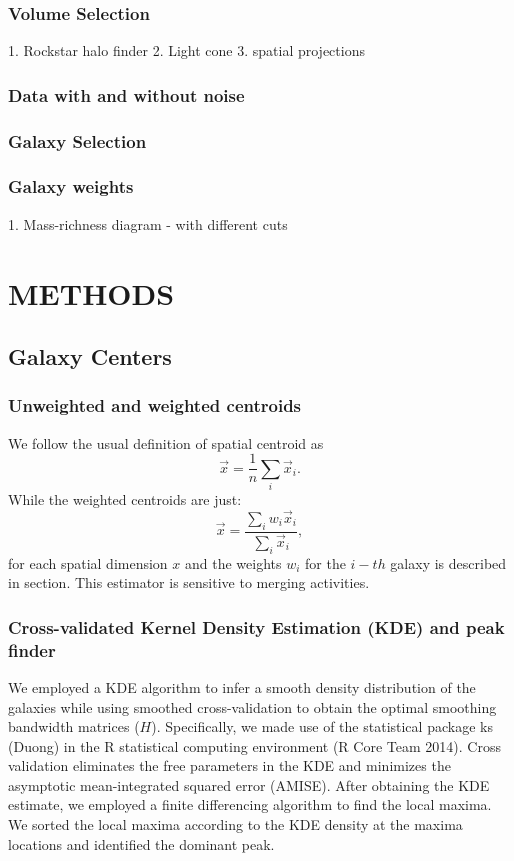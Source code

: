 \documentclass[letterpaper,useAMS,usenatbib]{mn2e}
\begin{document}
\subsubsection{Volume Selection}
1. Rockstar halo finder 
2. Light cone 
3. spatial projections 
\subsubsection{Data with and without noise}
\subsubsection{Galaxy Selection}
\subsubsection{Galaxy weights}
1. Mass-richness diagram - with different cuts  
\section{METHODS} 
\subsection{Galaxy Centers}
\subsubsection{Unweighted and weighted centroids}
We follow the usual definition of spatial centroid as 
\begin{equation}
	\vec{x} = \frac{1}{n} \sum_i \vec{x}_i. 
\end{equation}
While the weighted centroids are just: 
\begin{equation}
	\vec{x} = \frac{\sum_i w_i \vec{x}_i}{\sum_i \vec{x}_i},
\end{equation}
for each spatial dimension $x$ and the weights $w_i$ for the $i-th$ galaxy
is described in section.
This estimator is sensitive to merging activities. 

\subsubsection{Cross-validated Kernel Density Estimation (KDE) and peak finder} 
We employed a KDE algorithm to infer a smooth density distribution of the
galaxies while using smoothed cross-validation to obtain the optimal smoothing
bandwidth matrices ($H$). Specifically, we made use of the statistical package 
ks (Duong) in the R statistical computing environment (R Core Team 2014).
Cross validation eliminates the free parameters in the KDE and minimizes
the asymptotic mean-integrated squared error (AMISE).
After obtaining the KDE estimate, we employed a finite differencing algorithm
to find the local maxima. We sorted the local maxima according to the KDE
density at the maxima locations and identified the dominant peak. 
\end{document}
